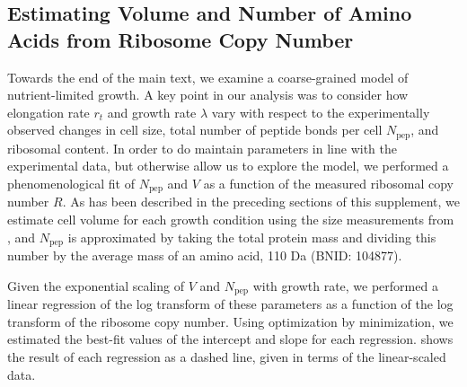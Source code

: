 \subsection{Estimating Volume and Number of Amino Acids from Ribosome Copy Number}
Towards the end of the main text, we examine a coarse-grained model of
nutrient-limited growth. A key point in our analysis was to consider  how
elongation rate $r_t$ and growth rate $\lambda$ vary with respect to the
experimentally observed changes in cell size, total number of peptide bonds per
cell  $N_\text{pep}$, and ribosomal content.  In order to do maintain parameters
in line with the experimental data, but otherwise allow us to explore the
model, we performed a phenomenological fit of $N_\text{pep}$ and $V$ as a
function of the measured ribosomal copy number $R$. As has been described in the
preceding sections of this supplement, we estimate cell volume for each growth
condition using the size measurements from \cite{si2017,si2019}, and
$N_\text{pep}$ is approximated by taking the total protein mass and dividing
this number by the average mass of an amino acid, 110 Da (BNID: 104877).

Given the  exponential scaling of $V$ and $N_\text{pep}$ with growth rate,
we performed a linear regression of the log transform of these parameters
as a function of the log transform of the ribosome copy number. Using
optimization by minimization, we estimated the best-fit values of the intercept
and slope for each regression.  shows the result of each
regression as a dashed line, given in terms of the linear-scaled data.

\begin{figure}
\end{figure}
